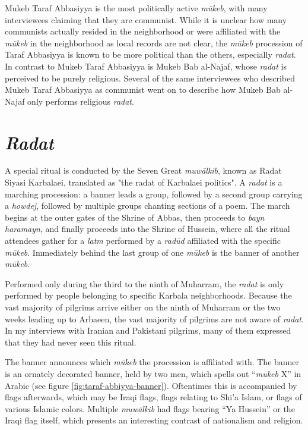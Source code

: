 Mukeb Taraf Abbasiyya is the most politically active \emph{mūkeb}, with many interviewees claiming that they are communist. While it is unclear how many communists actually resided in the neighborhood or were affiliated with the \emph{mūkeb} in the neighborhood as local records are not clear, the \emph{mūkeb} procession of Taraf Abbasiyya is known to be more political than the others, especially \emph{radat}. In contrast to Mukeb Taraf Abbasiyya is Mukeb Bab al-Najaf, whose \emph{radat} is perceived to be purely religious. Several of the same interviewees who described Mukeb Taraf Abbasiyya as communist went on to describe how Mukeb Bab al-Najaf only performs religious \emph{radat}. 

\section{\emph{Radat}}
A special ritual is conducted by the Seven Great \emph{muwālkib}, known as Radat Siyasi Karbalaei, translated as "the radat of Karbalaei politics". A \emph{radat} is a marching procession: a banner leads a group, followed by a second group carrying a \emph{howdej}, followed by multiple groups chanting sections of a poem. The march begins at the outer gates of the Shrine of Abbas, then proceeds to \emph{bayn haramayn}, and finally proceeds into the Shrine of Hussein, where all the ritual attendees gather for a \emph{latm} performed by a \emph{radūd} affiliated with the specific \emph{mūkeb}. Immediately behind the last group of one \emph{mūkeb} is the banner of another \emph{mūkeb}. 

Performed only during the third to the ninth of Muharram, the \emph{radat} is only performed by people belonging to specific Karbala neighborhoods. Because the vast majority of pilgrims arrive either on the ninth of Muharram or the two weeks leading up to Arbaeen, the vast majority of pilgrims are not aware of \emph{radat}. In my interviews with Iranian and Pakistani pilgrims, many of them expressed that they had never seen this ritual. 

The banner announces which \emph{mūkeb} the procession is affiliated with. The banner is an ornately decorated banner, held by two men, which spells out “\emph{mūkeb} X” in Arabic (see figure \ref{fig:taraf-abbiyya-banner}). Oftentimes this is accompanied by flags afterwards, which may be Iraqi flags, flags relating to Shi'a Islam, or flags of various Islamic colors. Multiple \emph{muwālkib} had flags bearing “Ya Hussein” or the Iraqi flag itself, which presents an interesting contrast of nationalism and religion. 

